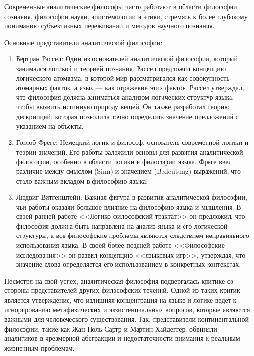 \documentclass[12pt,a4paper]{article}
\begin{document}
	Современные аналитические философы часто работают в области философии сознания, философии науки, эпистемологии и этики, стремясь к более глубокому пониманию субъективных переживаний и методов научного познания. 
	
	Основные представители аналитической философии:
	\begin{enumerate}
		\item Бертран Рассел: Один из основателей аналитической философии, который занимался логикой и теорией познания. Рассел предложил концепцию логического атомизма, в которой мир рассматривался как совокупность атомарных фактов, а язык — как отражение этих фактов. Рассел утверждал, что философия должна заниматься анализом логических структур языка, чтобы выявить истинную природу вещей. Он также разработал теорию дескрипций, которая позволила точно определить значение предложений с указанием на объекты.
		
		\item Готлоб Фреге: Немецкий логик и философ, основатель современной логики и теории значений. Его работы заложили основы для развития аналитической философии, особенно в области логики и философии языка. Фреге ввел различие между смыслом (Sinn) и значением (Bedeutung) выражений, что стало важным вкладом в философию языка.
		
		\item Людвиг Витгенштейн: Важная фигура в развитии аналитической философии, чьи работы оказали большое влияние на философию языка и мышления. В своей ранней работе <<Логико-философский трактат>>  он предложил, что философия должна быть направлена на анализ языка и его логической структуры, а все философские проблемы являются следствием неправильного использования языка. В своей более поздней работе <<Философские исследования>> он развил концепцию <<языковых игр>>, утверждая, что значение слова определяется его использованием в конкретных контекстах.
	\end{enumerate}
	
	\par Несмотря на свой успех, аналитическая философия подвергалась критике со стороны представителей других философских течений. Одной из таких критик является утверждение, что излишняя концентрация на языке и логике ведет к игнорированию метафизических и экзистенциальных вопросов, которые являются важными для человеческого существования. Так, представители континентальной философии, такие как Жан-Поль Сартр и Мартин Хайдеггер, обвиняли аналитиков в чрезмерной абстракции и недостаточности внимания к реальным жизненным проблемам.
	
\end{document}
